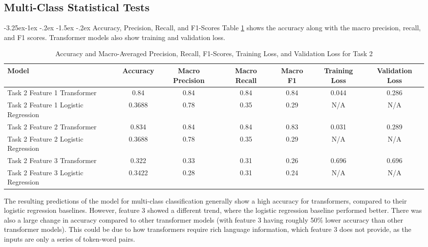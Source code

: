 \documentclass[10.7pt, onecolumn]{article}
\makeatletter
\renewcommand\subsubsection{\@startsection{subsubsection}{3}{\z@}%
	{-3.25ex\@plus -1ex \@minus -.2ex}%
    {-1.5ex \@plus -.2ex}%
    {\normalfont\itshape}}
\makeatother
\begin{document}

\subsection{Multi-Class Statistical Tests}

\subsubsection{Accuracy, Precision, Recall, and F1-Scores}
Table \ref{tab:task2accEtc} shows the accuracy along with the macro precision, recall, and F1 scores. Transformer models also show training and validation loss.
\begin{table}[H]
  \small
  \centering
  \setlength{\tabcolsep}{4pt} 
  \begin{tabular}{|p{3cm}|c|c|c|c|c|c|}
    \hline
    \textbf{Model} & \textbf{Accuracy} & \textbf{Macro Precision} & \textbf{Macro Recall} & \textbf{Macro F1}  & \textbf{Training Loss} & \textbf{Validation Loss}\\
    \hline
    Task 2 Feature 1 Transformer & 0.84  & 0.84  & 0.84  & 0.84 &0.044 &0.286\\
    \hline
    Task 2 Feature 1 Logistic Regression & 0.3688 & 0.78  & 0.35  & 0.29 & N/A &N/A\\
    \hline
    Task 2 Feature 2 Transformer & 0.834 & 0.84  & 0.84  & 0.83 &0.031 &0.289 \\
    \hline
    Task 2 Feature 2 Logistic Regression & 0.3688 & 0.78  & 0.35  & 0.29 &N/A &N/A\\
    \hline
    Task 2 Feature 3 Transformer & 0.322 & 0.33  & 0.31  & 0.26 &0.696 &0.696\\
    \hline
    Task 2 Feature 3 Logistic Regression & 0.3422 & 0.28  & 0.31  & 0.24 &N/A &N/A\\
    \hline
  \end{tabular}
  \caption{Accuracy and Macro-Averaged Precision, Recall, F1-Scores, Training Loss, and Validation Loss for Task 2}
  \label{tab:task2accEtc}
\end{table}

The resulting predictions of the model for multi-class classification generally show a high accuracy for transformers, compared to their logistic regression baselines. However, feature 3 showed a different trend, where the logistic regression baseline performed better. There was also a large change in accuracy compared to other transformer models (with feature 3 having roughly 50\% lower accuracy than other transformer models). This could be due to how transformers require rich language information, which feature 3 does not provide, as the inputs are only a series of token-word pairs.
\end{document}
